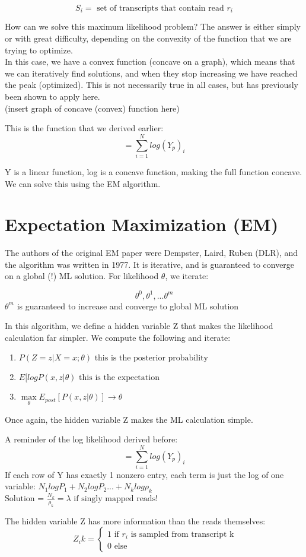 \documentclass{article}
\begin{document}
\[S_i = \text{ set of transcripts that contain read } r_i \]

How can we solve this maximum likelihood problem? The answer is either simply or with great difficulty, depending on the convexity of the function that we are trying to optimize. \\ In this case, we have a convex function (concave on a graph), which means that we can iteratively find solutions, and when they stop increasing we have reached the peak (optimized). This is not necessarily true in all cases, but has previously been shown to apply here. \\

(insert graph of concave (convex) function here)

This is the function that we derived earlier:
\[= \sum\limits_{i=1}^N log(Y_p)_i \]

Y is a linear function, log is a concave function, making the full function concave. We can solve this using the EM algorithm.

\section{Expectation Maximization (EM)}
The authors of the original EM paper were Dempster, Laird, Ruben (DLR), and the algorithm was written in 1977. It is iterative, and is guaranteed to converge on a global (!) ML solution. For likelihood $\theta$, we iterate:

\[ \theta^0, \theta^1, ... \theta^m \]
$\theta^m$ is guaranteed to increase and converge to global ML solution

In this algorithm, we define a hidden variable Z that makes the likelihood calculation far simpler. We compute the following and iterate:

  \begin{enumerate}
    \item $P(Z=z|X=x;\theta) \text{    this is the posterior probability}$
    \item $E[logP(x,z|\theta) \text{    this is the expectation}$
    \item $\max\limits_\theta E_{post}[P(x,z|\theta)] \rightarrow \theta$
  \end{enumerate}


Once again, the hidden variable Z makes the ML calculation simple.

A reminder of the log likelihood derived before:\\
\[=\sum\limits_{i=1}^N log(Y_p)_i\]
If each row of Y has exactly 1 nonzero entry, each term is just the log of one variable:
$N_1logP_1 + N_2logP_2 ... + N_klog\rho_k$
$\text{Solution = } \frac{N_k}{\rho_k} = \lambda \text{ if singly mapped reads!}$

The hidden variable Z has more information than the reads themselves:
\begin{equation}
\  Z_ik=
  \begin{cases}
    1 \text{ if $r_i$ is sampled from transcript k} \\
    0 \text{ else}
  \end{cases}
\end{equation}


\end{document}

